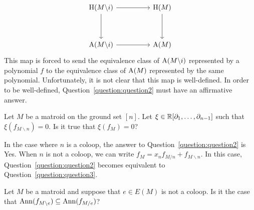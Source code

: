 \documentclass{puthesis-UG}
\begin{document}
\begin{equation} \label{eqn:mobius-basis-ring-injection}
	\begin{tikzcd}
	{\operatorname{H}(M\backslash i)} && {\operatorname{H} (M)} \\
	\\
	{\operatorname{A}(M\backslash i)} && {\operatorname{A}(M)}
	\arrow[from=1-1, to=1-3]
	\arrow[from=1-3, to=3-3]
	\arrow[from=1-1, to=3-1]
	\arrow[from=3-1, to=3-3]
\end{tikzcd}
\end{equation}
This map is forced to send the equivalence class of $\operatorname{A}(M \backslash i)$ represented by a polynomial $f$ to the equivalence class of $\operatorname{A}(M)$ represented by the same polynomial. Unfortunately, it is not clear that this map is well-defined. In order to be well-defined, Question~\ref{question:question2} must have an affirmative answer. 

\begin{question} \label{question:question2}
	Let $M$ be a matroid on the ground set $[n]$. Let $\xi \in \mathbb{R}[\partial_1, \ldots, \partial_{n-1}]$ such that $\xi (f_{M \backslash n}) = 0$. Is it true that $\xi (f_M) = 0$? 
\end{question}

In the case where $n$ is a coloop, the answer to Question~\ref{question:question2} is Yes. When $n$ is not a coloop, we can write $f_M = x_n f_{M / n} + f_{M \backslash n}$. In this case, Question~\ref{question:question2} becomes equivalent to Question~\ref{question:question3}. 

\begin{question} \label{question:question3}
 	Let $M$ be a matroid and suppose that $e \in E(M)$ is not a coloop. Is it the case that $\operatorname{Ann} (f_{M \backslash e}) \subseteq \operatorname{Ann} (f_{M / e})$? 
\end{question}
\end{document}
